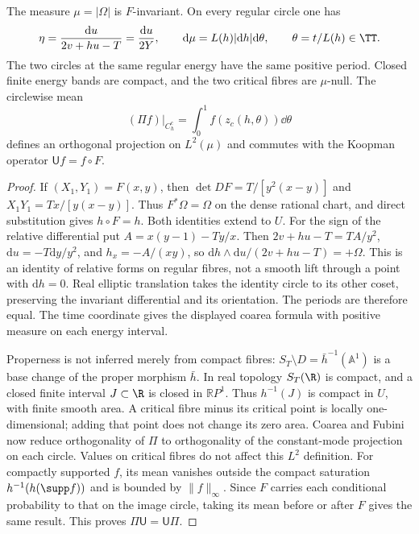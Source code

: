 \begin{lemma}\label{lem:coarea-projection}
The measure $\mu=|\Omega|$ is $F$-invariant. On every regular circle
one has
\[
 \eta=\frac{\mathrm du}{2v+hu-T}=\frac{\mathrm du}{2Y},
 \qquad \mathrm d\mu=L(h)|\mathrm dh|\mathrm d\theta,
 \qquad \theta=t/L(h)\in\TT.
\]
The two circles at the same regular energy have the same positive
period. Closed finite energy bands are compact, and the two critical
fibres are $\mu$-null. The circlewise mean
\begin{equation}
 (\Pi f)|_{C_h^c}=\int_0^1 f(z_c(h,\theta))\dd\theta
 \label{surf:projection}
\end{equation}
defines an orthogonal projection on $L^2(\mu)$ and commutes with
the Koopman operator $\mathsf U f=f\circ F$.
\end{lemma}
\begin{proof}
If $(X_1,Y_1)=F(x,y)$, then
$\det DF=T/[y^2(x-y)]$ and $X_1Y_1=Tx/[y(x-y)]$.
Thus $F^*\Omega=\Omega$ on the dense rational chart, and direct
substitution gives $h\circ F=h$. Both identities extend to $U$.
For the sign of the relative differential put
$A=x(y-1)-Ty/x$. Then
$2v+hu-T=TA/y^2$, $\mathrm du=-T\mathrm dy/y^2$, and
$h_x=-A/(xy)$, so
$\mathrm dh\wedge\mathrm du/(2v+hu-T)=+\Omega$.
This is an identity of relative forms on regular fibres, not a smooth
lift through a point with $\mathrm dh=0$.
Real elliptic translation takes the identity circle to its other
coset, preserving the invariant differential and its orientation.
The periods are therefore equal. The time coordinate gives the
displayed coarea formula with positive measure on each energy interval.

Properness is not inferred merely from compact fibres:
$S_T\setminus D=\bar h^{-1}(\mathbb A^1)$ is a base change of
the proper morphism $\bar h$. In real topology $S_T(\R)$ is compact,
and a closed finite interval $J\subset\R$ is closed in
$\mathbb RP^1$. Thus $h^{-1}(J)$ is compact in $U$, with finite
smooth area. A critical fibre minus its critical point is locally
one-dimensional; adding that point does not change its zero area.
Coarea and Fubini now reduce orthogonality of $\Pi$ to orthogonality
of the constant-mode projection on each circle. Values on critical
fibres do not affect this $L^2$ definition. For compactly supported
$f$, its mean vanishes outside the compact saturation
$h^{-1}(h(\supp f))$ and is bounded by $\|f\|_\infty$.
Since $F$ carries each conditional probability to that on the image
circle, taking its mean before or after $F$ gives the same result.
This proves $\Pi\mathsf U=\mathsf U\Pi$.
\end{proof}

